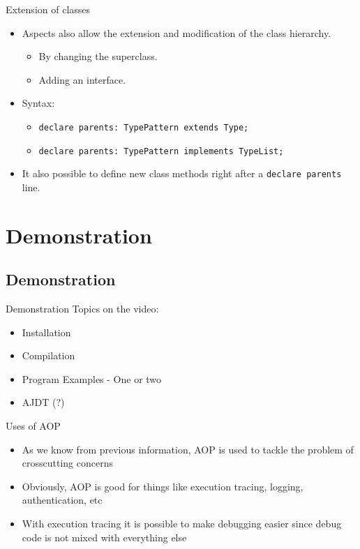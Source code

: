 \documentclass[11pt]{beamer}
\begin{document}
\begin{frame}{Extension of classes}
   \begin{itemize}
      \item Aspects also allow the extension and modification of the class hierarchy.
      \begin{itemize}
         \item By changing the superclass.
         \item Adding an interface.
      \end{itemize}
      \item Syntax:
      \begin{itemize}
         \item \texttt{declare parents: TypePattern extends Type;}
         \item \texttt{declare parents: TypePattern implements TypeList;}
      \end{itemize}
      \item It also possible to define new class methods right after a \texttt{declare parents} line.
   \end{itemize}
\end{frame}

\section{Demonstration}
\subsection*{Demonstration}

\begin{frame}{Demonstration}
Topics on the video:
\begin{itemize}
\item Installation
\item Compilation
\item Program Examples - One or two
\item AJDT (?)
\end{itemize}
\end{frame}

\begin{frame}{Uses of AOP}
\begin{itemize}
   \item As we know from previous information, AOP is used to tackle the problem of crosscutting concerns
   \item Obviously, AOP is good for things like execution tracing, logging, authentication, etc
   \item With execution tracing it is possible to make debugging easier since debug code is not mixed with everything else
\end{itemize}
\end{frame}
\end{document}
